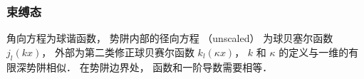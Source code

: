 

\subsubsection{束缚态}

角向方程为球谐函数， 势阱内部的径向方程 （unscaled） 为球贝塞尔函数 $j_l(kx)$，  外部为第二类修正球贝赛尔函数 $k_l(\kappa x)$，   $k$ 和 $\kappa $ 的定义与一维的有限深势阱相似． 在势阱边界处， 函数和一阶导数需要相等． 
